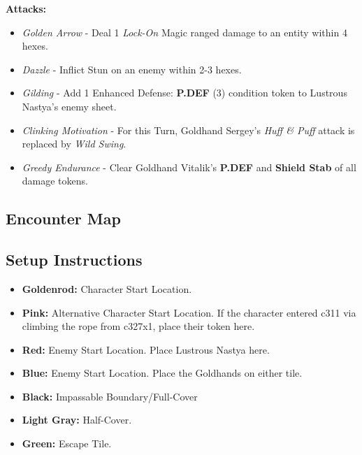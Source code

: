 \textbf{Attacks:}
\begin{itemize}
\item \emph{Golden Arrow} -  Deal 1 \emph{Lock-On} Magic ranged damage to an entity within 4 hexes.
\item \emph{Dazzle} - Inflict Stun on an enemy within 2-3 hexes.
\item \emph{Gilding} - Add 1 Enhanced Defense: \textbf{P.DEF} (3) condition token to Lustrous Nastya’s enemy sheet.
\item \emph{Clinking Motivation} - For this Turn, Goldhand Sergey’s \emph{Huff \& Puff} attack is replaced by \emph{Wild Swing}.
\item \emph{Greedy Endurance} - Clear Goldhand Vitalik’s \textbf{P.DEF} and \textbf{Shield Stab} of all damage tokens. 
\end{itemize}

\pagebreak

\subsection*{Encounter Map}
\begin{center}
\end{center}

\subsection*{Setup Instructions}
\begin{itemize}
\item \textbf{Goldenrod:} Character Start Location.
\item \textbf{Pink:} Alternative Character Start Location. If the character entered c311 via climbing the rope from c327x1, place their token here.
\item \textbf{Red:} Enemy Start Location. Place Lustrous Nastya here.
\item \textbf{Blue:} Enemy Start Location. Place the Goldhands on either tile.
\item \textbf{Black:} Impassable Boundary/Full-Cover
\item \textbf{Light Gray:} Half-Cover.
\item \textbf{Green:} Escape Tile.
\end{itemize}

